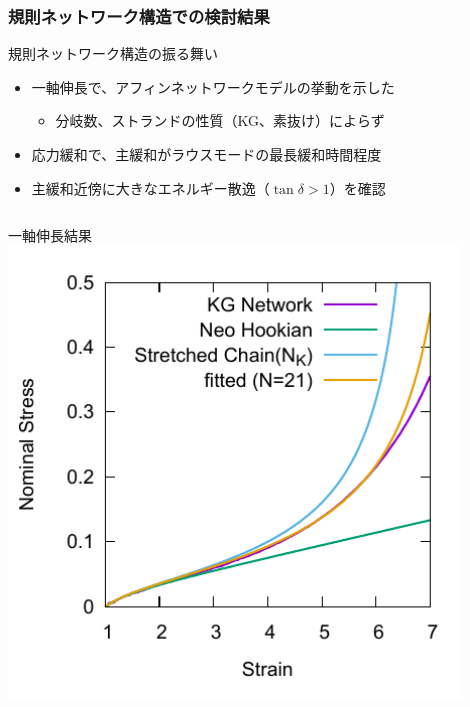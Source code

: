 \documentclass[12pt, dvipdfmx]{beamer}
\begin{document}
\begin{frame}
\begin{columns}[totalwidth=\textwidth]
\begin{itemize}
			\end{itemize}
	\end{columns}
\end{frame}

\begin{frame}
	\frametitle{規則ネットワーク構造での検討結果}
		\small
		\begin{alertblock}{規則ネットワーク構造の振る舞い}
			\begin{itemize}
				\item 一軸伸長で、\alert{アフィンネットワークモデルの挙動}を示した
					\begin{itemize}
						\item \alert{分岐数、ストランドの性質（KG、素抜け）}によらず
					\end{itemize}
				\item 応力緩和で、主緩和がラウスモードの最長緩和時間程度
				\item 主緩和近傍に大きなエネルギー散逸（$\tan \delta > 1$）を確認
			\end{itemize}
		\end{alertblock}
		\begin{columns}[totalwidth=1\textwidth]
				\scriptsize
				一軸伸長結果
				\includegraphics[width=0.9\textwidth]{SS_Kuhn.pdf}
				\scriptsize

\end{columns}
\end{frame}
\end{document}
